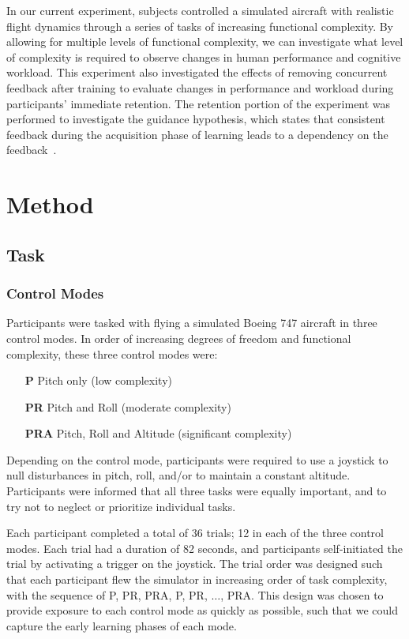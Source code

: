 In our current experiment, subjects controlled a simulated aircraft with realistic flight dynamics through a series of tasks of increasing functional complexity.
By allowing for multiple levels of functional complexity, we can investigate what level of complexity is required to observe changes in human performance and cognitive workload.
This experiment also investigated the effects of removing concurrent feedback after training to evaluate changes in performance and workload during participants' immediate retention.
The retention portion of the experiment was performed to investigate the guidance hypothesis, which states that consistent feedback during the acquisition phase of learning leads to a dependency on the feedback~\citep{salmoni_knowledge_1984}.

\section{Method}
\subsection{Task}
\subsubsection{Control Modes}
Participants were tasked with flying a simulated Boeing 747 aircraft in three control modes. In order of increasing degrees of freedom and functional complexity, these three control modes were:
\begin{itemize}
    \item[\textbf{P}] Pitch only (low complexity)
    \item[\textbf{PR}] Pitch and Roll (moderate complexity)
    \item[\textbf{PRA}] Pitch, Roll and Altitude (significant complexity)
\end{itemize}
Depending on the control mode, participants were required to use a joystick to null disturbances in pitch, roll, and/or to maintain a constant altitude.
Participants were informed that all three tasks were equally important, and to try not to neglect or prioritize individual tasks.

Each participant completed a total of 36 trials; 12 in each of the three control modes.
Each trial had a duration of 82 seconds, and participants self-initiated the trial by activating a trigger on the joystick.
The trial order was designed such that each participant flew the simulator in increasing order of task complexity, with the sequence of P, PR, PRA, P, PR, $\ldots$, PRA.
This design was chosen to provide exposure to each control mode as quickly as possible, such that we could capture the early learning phases of each mode.

